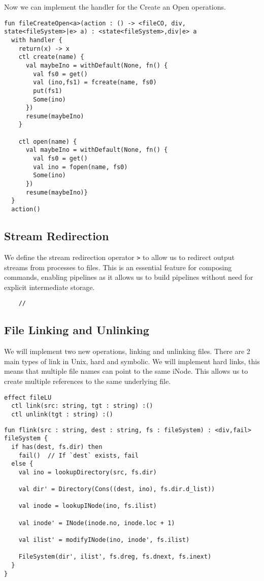 \documentclass[logo,bsc,singlespacing,parskip]{infthesis}
\begin{document}
Now we can implement the handler for the Create an Open operations.

\begin{lstlisting}
fun fileCreateOpen<a>(action : () -> <fileCO, div, state<fileSystem>|e> a) : <state<fileSystem>,div|e> a
  with handler {
    return(x) -> x
    ctl create(name) {
      val maybeIno = withDefault(None, fn() {
        val fs0 = get()
        val (ino,fs1) = fcreate(name, fs0)
        put(fs1)
        Some(ino)
      })
      resume(maybeIno)
    }

    ctl open(name) {
      val maybeIno = withDefault(None, fn() {
        val fs0 = get()
        val ino = fopen(name, fs0)
        Some(ino)
      })
      resume(maybeIno)}  
  }
  action()
\end{lstlisting}

\subsection{Stream Redirection}
We define the stream redirection operator \texttt{>} to allow us to redirect output streams from processes to files. This is an essential feature for composing commands, enabling pipelines as it allows us to build pipelines without need for explicit intermediate storage.


\begin{lstlisting}
    //
\end{lstlisting}

\subsection{File Linking and Unlinking}
We will implement two new operations, linking and unlinking files. There are 2 main types of link in Unix, hard and symbolic. We will implement hard links, this means that multiple file names can point to the same iNode. This allows us to create multiple references to the same underlying file.

\begin{lstlisting}
effect fileLU
  ctl link(src: string, tgt : string) :()
  ctl unlink(tgt : string) :()
\end{lstlisting}


\begin{lstlisting}
fun flink(src : string, dest : string, fs : fileSystem) : <div,fail> fileSystem {
  if has(dest, fs.dir) then
    fail()  // If `dest` exists, fail
  else {
    val ino = lookupDirectory(src, fs.dir)

    val dir' = Directory(Cons((dest, ino), fs.dir.d_list))

    val inode = lookupINode(ino, fs.ilist)

    val inode' = INode(inode.no, inode.loc + 1)

    val ilist' = modifyINode(ino, inode', fs.ilist)

    FileSystem(dir', ilist', fs.dreg, fs.dnext, fs.inext)
  }
}
\end{lstlisting}
\end{document}
